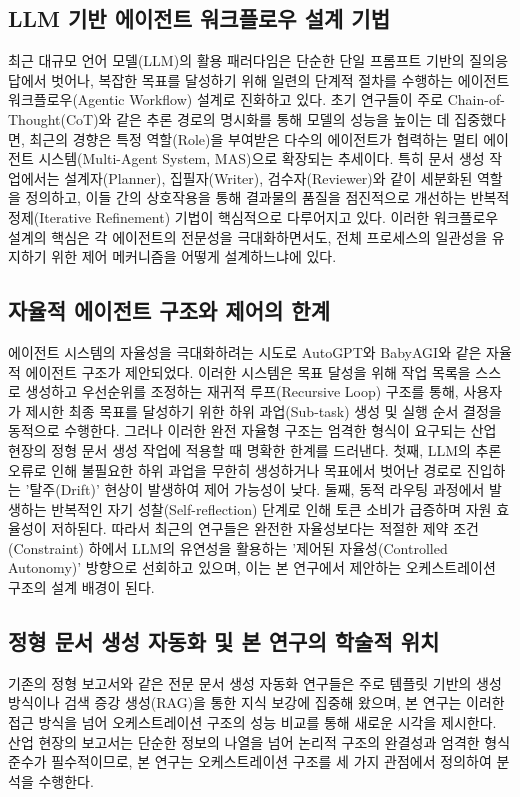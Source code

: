 \subsection{LLM 기반 에이전트 워크플로우 설계 기법}
최근 대규모 언어 모델(LLM)의 활용 패러다임은 단순한 단일 프롬프트 기반의 질의응답에서 벗어나, 복잡한 목표를 달성하기 위해 일련의 단계적 절차를 수행하는 에이전트 워크플로우(Agentic Workflow) 설계로 진화하고 있다. 초기 연구들이 주로 Chain-of-Thought(CoT)와 같은 추론 경로의 명시화를 통해 모델의 성능을 높이는 데 집중했다면, 최근의 경향은 특정 역할(Role)을 부여받은 다수의 에이전트가 협력하는 멀티 에이전트 시스템(Multi-Agent System, MAS)으로 확장되는 추세이다. 특히 문서 생성 작업에서는 설계자(Planner), 집필자(Writer), 검수자(Reviewer)와 같이 세분화된 역할을 정의하고, 이들 간의 상호작용을 통해 결과물의 품질을 점진적으로 개선하는 반복적 정제(Iterative Refinement) 기법이 핵심적으로 다루어지고 있다. 이러한 워크플로우 설계의 핵심은 각 에이전트의 전문성을 극대화하면서도, 전체 프로세스의 일관성을 유지하기 위한 제어 메커니즘을 어떻게 설계하느냐에 있다.

\subsection{자율적 에이전트 구조와 제어의 한계}
에이전트 시스템의 자율성을 극대화하려는 시도로 AutoGPT와 BabyAGI와 같은 자율적 에이전트 구조가 제안되었다. 이러한 시스템은 목표 달성을 위해 작업 목록을 스스로 생성하고 우선순위를 조정하는 재귀적 루프(Recursive Loop) 구조를 통해, 사용자가 제시한 최종 목표를 달성하기 위한 하위 과업(Sub-task) 생성 및 실행 순서 결정을 동적으로 수행한다. 그러나 이러한 완전 자율형 구조는 엄격한 형식이 요구되는 산업 현장의 정형 문서 생성 작업에 적용할 때 명확한 한계를 드러낸다. 첫째, LLM의 추론 오류로 인해 불필요한 하위 과업을 무한히 생성하거나 목표에서 벗어난 경로로 진입하는 '탈주(Drift)' 현상이 발생하여 제어 가능성이 낮다. 둘째, 동적 라우팅 과정에서 발생하는 반복적인 자기 성찰(Self-reflection) 단계로 인해 토큰 소비가 급증하며 자원 효율성이 저하된다. 따라서 최근의 연구들은 완전한 자율성보다는 적절한 제약 조건(Constraint) 하에서 LLM의 유연성을 활용하는 '제어된 자율성(Controlled Autonomy)' 방향으로 선회하고 있으며, 이는 본 연구에서 제안하는 오케스트레이션 구조의 설계 배경이 된다.

\subsection{정형 문서 생성 자동화 및 본 연구의 학술적 위치}
기존의 정형 보고서와 같은 전문 문서 생성 자동화 연구들은 주로 템플릿 기반의 생성 방식이나 검색 증강 생성(RAG)을 통한 지식 보강에 집중해 왔으며, 본 연구는 이러한 접근 방식을 넘어 오케스트레이션 구조의 성능 비교를 통해 새로운 시각을 제시한다. 산업 현장의 보고서는 단순한 정보의 나열을 넘어 논리적 구조의 완결성과 엄격한 형식 준수가 필수적이므로, 본 연구는 오케스트레이션 구조를 세 가지 관점에서 정의하여 분석을 수행한다.

